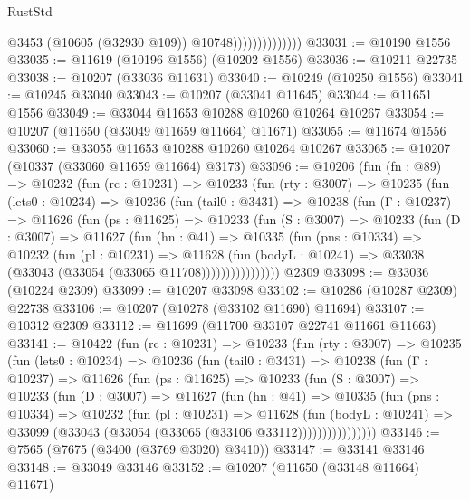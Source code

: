 \begin{lexlean}{RustStd}
\begin{coremodule}
                                @3453
                                (@10605 (@32930 @109))
                                @10748))))))))))))))
@33031 := @10190 @1556
@33035 := @11619 (@10196 @1556) (@10202 @1556)
@33036 := @10211 @22735
@33038 := @10207 (@33036 @11631)
@33040 := @10249 (@10250 @1556)
@33041 := @10245 @33040
@33043 := @10207 (@33041 @11645)
@33044 := @11651 @1556
@33049 := @33044 @11653 @10288 @10260 @10264 @10267
@33054 := @10207 (@11650 (@33049 @11659 @11664) @11671)
@33055 := @11674 @1556
@33060 := @33055 @11653 @10288 @10260 @10264 @10267
@33065 := @10207 (@10337 (@33060 @11659 @11664) @3173)
@33096 := @10206
    (fun (fn : @89) =>
    @10232
      (fun (rc : @10231) =>
      @10233
        (fun (rty : @3007) =>
        @10235
          (fun (lets0 : @10234) =>
          @10236
            (fun (tail0 : @3431) =>
            @10238
              (fun (Γ : @10237) =>
              @11626
                (fun (ps : @11625) =>
                @10233
                  (fun (S : @3007) =>
                  @10233
                    (fun (D : @3007) =>
                    @11627
                      (fun (hn : @41) =>
                      @10335
                        (fun (pns : @10334) =>
                        @10232
                          (fun (pl : @10231) =>
                          @11628
                            (fun (bodyL : @10241) =>
                            @33038 (@33043 (@33054 (@33065 @11708))))))))))))))))
    @2309
@33098 := @33036 (@10224 @2309)
@33099 := @10207 @33098
@33102 := @10286 (@10287 @2309) @22738
@33106 := @10207 (@10278 (@33102 @11690) @11694)
@33107 := @10312 @2309
@33112 := @11699 (@11700 @33107 @22741 @11661 @11663)
@33141 := @10422
    (fun (rc : @10231) =>
    @10233
      (fun (rty : @3007) =>
      @10235
        (fun (lets0 : @10234) =>
        @10236
          (fun (tail0 : @3431) =>
          @10238
            (fun (Γ : @10237) =>
            @11626
              (fun (ps : @11625) =>
              @10233
                (fun (S : @3007) =>
                @10233
                  (fun (D : @3007) =>
                  @11627
                    (fun (hn : @41) =>
                    @10335
                      (fun (pns : @10334) =>
                      @10232
                        (fun (pl : @10231) =>
                        @11628
                          (fun (bodyL : @10241) =>
                          @33099 (@33043 (@33054 (@33065 (@33106 @33112))))))))))))))))
@33146 := @7565 (@7675 (@3400 (@3769 @3020) @3410))
@33147 := @33141 @33146
@33148 := @33049 @33146
@33152 := @10207 (@11650 (@33148 @11664) @11671)

\end{coremodule}
\end{lexlean}
